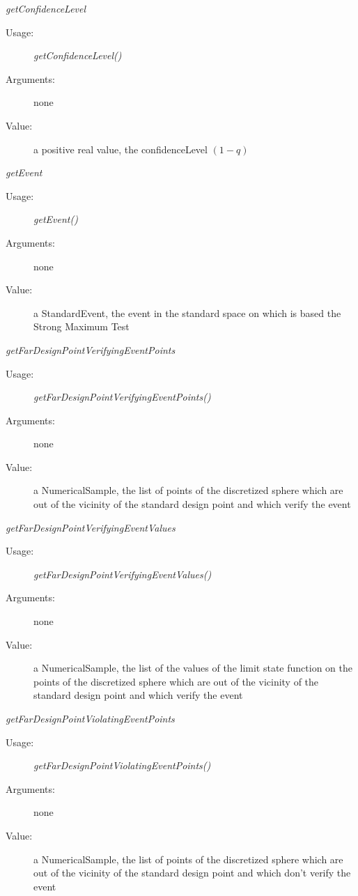 \begin{description}
\begin{description}
\item \textit{getConfidenceLevel}
\begin{description}
\item[Usage:] \textit{getConfidenceLevel()}
\item[Arguments:] none
\item[Value:]  a positive real value, the confidenceLevel $(1 - q)$
\end{description}
\bigskip

\item \textit{getEvent}
\begin{description}
\item[Usage:] \textit{getEvent()}
\item[Arguments:] none
\item[Value:]  a StandardEvent, the event in the standard space on which is based the Strong Maximum Test
\end{description}
\bigskip

\item \textit{getFarDesignPointVerifyingEventPoints}
\begin{description}
\item[Usage:] \textit{getFarDesignPointVerifyingEventPoints()}
\item[Arguments:] none
\item[Value:]  a NumericalSample, the list of points of the discretized sphere which are out of the vicinity of the standard design point and which verify the event
\end{description}
\bigskip

\item \textit{getFarDesignPointVerifyingEventValues}
\begin{description}
\item[Usage:] \textit{getFarDesignPointVerifyingEventValues()}
\item[Arguments:] none
\item[Value:]   a NumericalSample, the list of the values of the limit state function on the points of the discretized sphere which are out of the vicinity of the standard design point and which verify the event
\end{description}
\bigskip

\item \textit{getFarDesignPointViolatingEventPoints}
\begin{description}
\item[Usage:] \textit{getFarDesignPointViolatingEventPoints()}
\item[Arguments:] none
\item[Value:]   a NumericalSample, the list of points of the discretized sphere which are out of the vicinity of the standard design point and which don't verify the event
\end{description}
\bigskip


\end{description}
\end{description}

